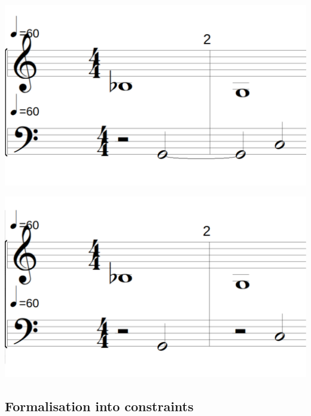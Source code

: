 \begin{enumerate}[wide, label=\bfseries 4.P\arabic*]
    \vspace{.5cm}
    \begin{minipage}{0.46\textwidth}
    \centering
    \includegraphics[width=\textwidth]{Images/hidden-fifths-1.png}
    \label{fig:hidden-fifths-1}
    \end{minipage}
    \hfill
    \begin{minipage}{0.46\textwidth}
      \centering
      \includegraphics[width=\textwidth]{Images/hidden-fifths-2.png}
      \label{fig:hidden-fifths-2}
    \end{minipage}

\end{enumerate}

\subsection{Formalisation into constraints}\label{formalisation-c-4th}
